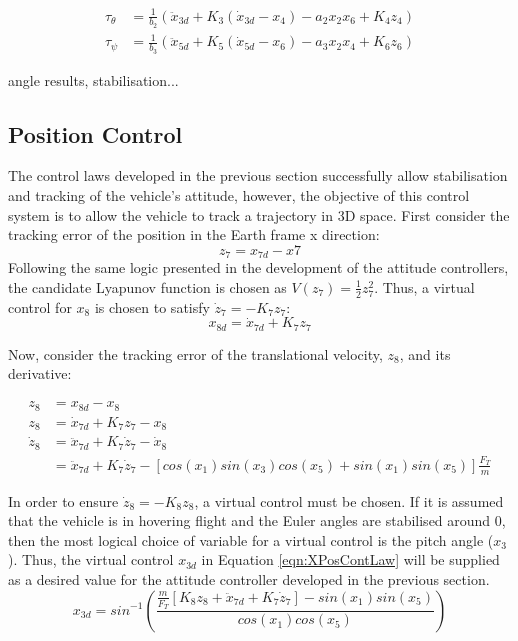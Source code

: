 \begin{equation}\label{eqn:BackstepAngleLaws}
\begin{split}
\tau_{\theta}&=\frac{1}{b_{2}}\left(\ddot{x}_{3d}+K_{3}(\dot{x}_{3d}-x_{4})-a_{2}x_{2}x_{6}+K_{4}z_{4}\right)\\
\tau_{\psi}&=\frac{1}{b_{3}}\left(\ddot{x}_{5d}+K_{5}(\dot{x}_{5d}-x_{6})-a_{3}x_{2}x_{4}+K_{6}z_{6}\right)
\end{split}
\end{equation}

angle results, stabilisation...

\subsection{Position Control}
The control laws developed in the previous section successfully allow stabilisation and tracking of the vehicle's attitude, however, the objective of this control system is to allow the vehicle to track a trajectory in 3D space. First consider the tracking error of the position in the Earth frame x direction:
\[z_{7}=x_{7d}-x{7}\]
Following the same logic presented in the development of the attitude controllers, the candidate Lyapunov function is chosen as $V(z_{7})=\frac{1}{2}z_{7}^{2}$. Thus, a virtual control for $x_{8}$ is chosen to satisfy $\dot{z}_{7}=-K_{7}z_{7}$:
\[x_{8d}=\dot{x}_{7d}+K_{7}z_{7}\]

Now, consider the tracking error of the translational velocity, $z_{8}$, and its derivative:

\[
\begin{split}
z_{8}&=x_{8d}-x_{8}\\
z_{8}&=\dot{x}_{7d}+K_{7}z_{7}-x_{8}\\
\dot{z}_{8}&=\ddot{x}_{7d}+K_{7}\dot{z}_{7}-\dot{x}_{8}\\
&=\ddot{x}_{7d}+K_{7}\dot{z}_{7}-[cos(x_{1})sin(x_{3})cos(x_{5})+sin(x_{1})sin(x_{5})]\frac{F_{T}}{m}
\end{split}
\]

In order to ensure $\dot{z}_{8}=-K_{8}z_{8}$, a virtual control must be chosen. If it is assumed that the vehicle is in hovering flight and the Euler angles are stabilised around 0\textdegree, then the most logical choice of variable for a virtual control is the pitch angle ($x_{3}$). Thus, the virtual control $x_{3d}$ in Equation \ref{eqn:XPosContLaw} will be supplied as a desired value for the attitude controller developed in the previous section. 
\begin{equation}\label{eqn:XPosContLaw}
x_{3d}=sin^{-1}\left(\frac{\frac{m}{F_{T}}[K_{8}z_{8}+\ddot{x}_{7d}+K_{7}\dot{z}_{7}]-sin(x_{1})sin(x_{5})}{cos(x_{1})cos(x_{5})}\right)
\end{equation}

